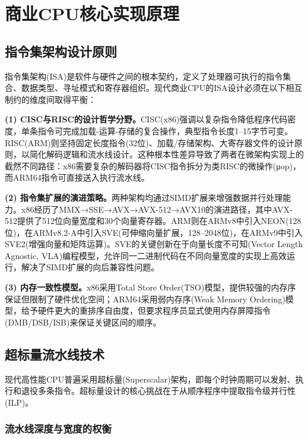 \documentclass[12pt,a4paper]{IEEEtran}
\begin{document}
\section{商业CPU核心实现原理}

\subsection{指令集架构设计原则}

指令集架构(ISA)是软件与硬件之间的根本契约，定义了处理器可执行的指令集合、数据类型、寻址模式和寄存器组织\cite{patterson2017risc}。现代商业CPU的ISA设计必须在以下相互制约的维度间取得平衡：

\textbf{(1) CISC与RISC的设计哲学分野。}CISC(x86)强调以复杂指令降低程序代码密度，单条指令可完成加载-运算-存储的复合操作，典型指令长度1--15字节可变。RISC(ARM)则坚持固定长度指令(32位)、加载/存储架构、大寄存器文件的设计原则，以简化解码逻辑和流水线设计\cite{seznec2016tage}。这种根本性差异导致了两者在微架构实现上的截然不同路径：x86需要复杂的解码器将CISC指令拆分为类RISC的微操作(μop)，而ARM64指令可直接送入执行流水线。

\textbf{(2) 指令集扩展的演进策略。}两种架构均通过SIMD扩展来增强数据并行处理能力。x86经历了MMX→SSE→AVX→AVX-512→AVX10的演进路径，其中AVX-512提供了512位向量宽度和30个向量寄存器\cite{intel2023avx512}。ARM则在ARMv8中引入NEON(128位)，在ARMv8.2-A中引入SVE(可伸缩向量扩展，128--2048位)，在ARMv9中引入SVE2(增强向量和矩阵运算)\cite{arm2021armv9}。SVE的关键创新在于向量长度不可知(Vector Length Agnostic, VLA)编程模型，允许同一二进制代码在不同向量宽度的实现上高效运行，解决了SIMD扩展的向后兼容性问题。

\textbf{(3) 内存一致性模型。}x86采用Total Store Order(TSO)模型，提供较强的内存序保证但限制了硬件优化空间；ARM64采用弱内存序(Weak Memory Ordering)模型，给予硬件更大的重排序自由度，但要求程序员显式使用内存屏障指令(DMB/DSB/ISB)来保证关键区间的顺序\cite{alarcon2023memorymodel}。

\subsection{超标量流水线技术}

现代高性能CPU普遍采用超标量(Superscalar)架构，即每个时钟周期可以发射、执行和退役多条指令。超标量设计的核心挑战在于从顺序程序中提取指令级并行性(ILP)\cite{smith1995superscalar}。

\subsubsection{流水线深度与宽度的权衡}
\end{document}
